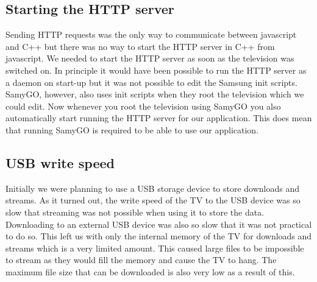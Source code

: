 \subsection{Starting the HTTP server}

Sending HTTP requests was the only way to communicate between javascript and C++ but there was no way to start the HTTP server in C++ from javascript. We needed to start the HTTP server as soon as the television was switched on. In principle it would have been possible to run the HTTP server as a daemon on start-up but it was not possible to edit the Samsung init scripts. SamyGO, however, also uses init scripts when they root the television which we could edit. Now whenever you root the television using SamyGO you also automatically start running the HTTP server for our application. This does mean that running SamyGO is required to be able to use our application.

\subsection{USB write speed}
Initially we were planning to use a USB storage device to store downloads and streams. As it turned out, the write speed of the TV to the USB device was so slow that streaming was not possible when using it to store the data. Downloading to an external USB device was also so slow that it was not practical to do so. This left us with only the internal memory of the TV for downloads and streams which is a very limited amount. This caused large files to be impossible to stream as they would fill the memory and cause the TV to hang. The maximum file size that can be downloaded is also very low as a result of this.
